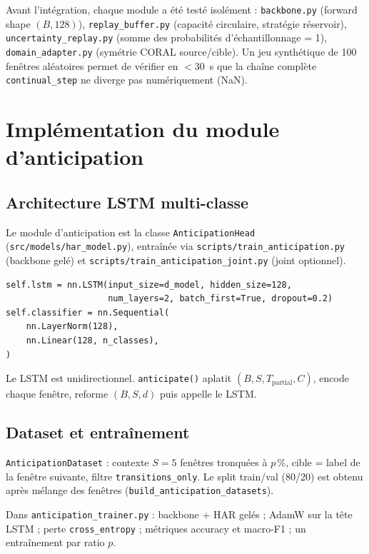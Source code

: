 Avant l'intégration, chaque module a été testé isolément : \texttt{backbone.py}
(forward shape $(B,128)$), \texttt{replay\_buffer.py} (capacité circulaire,
stratégie réservoir), \texttt{uncertainty\_replay.py} (somme des probabilités
d'échantillonnage = 1), \texttt{domain\_adapter.py} (symétrie CORAL source/cible).
Un jeu synthétique de 100 fenêtres aléatoires permet de vérifier en $<$30~s que
la chaîne complète \texttt{continual\_step} ne diverge pas numériquement (NaN).

\section{Implémentation du module d'anticipation}

\subsection{Architecture LSTM multi-classe}

Le module d'anticipation est la classe \texttt{AnticipationHead}
(\texttt{src/models/har\_model.py}), entraînée via
\texttt{scripts/train\_anticipation.py} (backbone gelé) et
\texttt{scripts/train\_anticipation\_joint.py} (joint optionnel).

\begin{verbatim}
self.lstm = nn.LSTM(input_size=d_model, hidden_size=128,
                    num_layers=2, batch_first=True, dropout=0.2)
self.classifier = nn.Sequential(
    nn.LayerNorm(128),
    nn.Linear(128, n_classes),
)
\end{verbatim}

Le LSTM est unidirectionnel. \texttt{anticipate()} aplatit
$(B,S,T_{\mathrm{partial}},C)$, encode chaque fenêtre, reforme $(B,S,d)$
puis appelle le LSTM.

\subsection{Dataset et entraînement}

\texttt{AnticipationDataset} : contexte $S=5$ fenêtres tronquées à $p\,\%$,
cible = label de la fenêtre suivante, filtre \texttt{transitions\_only}.
Le split train/val (80/20) est obtenu après mélange des fenêtres
(\texttt{build\_anticipation\_datasets}).

Dans \texttt{anticipation\_trainer.py} : backbone + HAR gelés ; AdamW sur la
tête LSTM ; perte \texttt{cross\_entropy} ; métriques accuracy et macro-F1 ;
un entraînement par ratio $p$.

